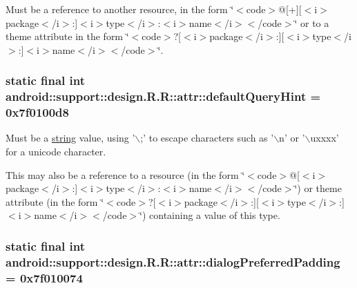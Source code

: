 Must be a reference to another resource, in the form \char`\"{}$<$code$>$@\mbox{[}+\mbox{]}\mbox{[}$<$i$>$package$<$/i$>$:\mbox{]}$<$i$>$type$<$/i$>$:$<$i$>$name$<$/i$>$$<$/code$>$\char`\"{} or to a theme attribute in the form \char`\"{}$<$code$>$?\mbox{[}$<$i$>$package$<$/i$>$:\mbox{]}\mbox{[}$<$i$>$type$<$/i$>$:\mbox{]}$<$i$>$name$<$/i$>$$<$/code$>$\char`\"{}. \hypertarget{classandroid_1_1support_1_1design_1_1_r_1_1attr_47a65c5b15ea8cbd783ba93b3bd64f00}{
\subsubsection[{defaultQueryHint}]{\setlength{\rightskip}{0pt plus 5cm}static final int android::support::design.R.R::attr::defaultQueryHint = 0x7f0100d8}}
\label{classandroid_1_1support_1_1design_1_1_r_1_1attr_47a65c5b15ea8cbd783ba93b3bd64f00}


Must be a \hyperlink{classandroid_1_1support_1_1design_1_1_r_1_1string}{string} value, using '$\backslash$;' to escape characters such as '$\backslash$n' or '$\backslash$uxxxx' for a unicode character. 

This may also be a reference to a resource (in the form \char`\"{}$<$code$>$@\mbox{[}$<$i$>$package$<$/i$>$:\mbox{]}$<$i$>$type$<$/i$>$:$<$i$>$name$<$/i$>$$<$/code$>$\char`\"{}) or theme attribute (in the form \char`\"{}$<$code$>$?\mbox{[}$<$i$>$package$<$/i$>$:\mbox{]}\mbox{[}$<$i$>$type$<$/i$>$:\mbox{]}$<$i$>$name$<$/i$>$$<$/code$>$\char`\"{}) containing a value of this type. \hypertarget{classandroid_1_1support_1_1design_1_1_r_1_1attr_8eb98efb890fb1f66ecf8808474c9e71}{
\subsubsection[{dialogPreferredPadding}]{\setlength{\rightskip}{0pt plus 5cm}static final int android::support::design.R.R::attr::dialogPreferredPadding = 0x7f010074}}
\label{classandroid_1_1support_1_1design_1_1_r_1_1attr_8eb98efb890fb1f66ecf8808474c9e71}


